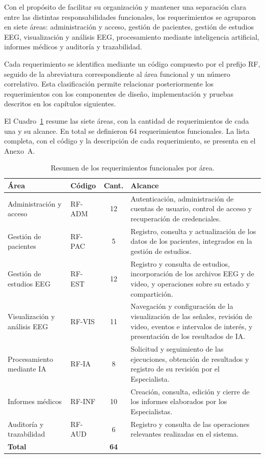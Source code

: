 Con el propósito de facilitar su organización y mantener una separación
clara entre las distintas responsabilidades funcionales, los requerimientos
se agruparon en siete áreas: administración y acceso, gestión de pacientes,
gestión de estudios EEG, visualización y análisis EEG, procesamiento mediante
inteligencia artificial, informes médicos y auditoría y trazabilidad.

Cada requerimiento se identifica mediante un código compuesto por el prefijo
RF, seguido de la abreviatura correspondiente al área funcional y un número
correlativo. Esta clasificación permite relacionar posteriormente los
requerimientos con los componentes de diseño, implementación y pruebas
descritos en los capítulos siguientes.

\begin{nuevotexto}
El Cuadro~\ref{tab:resumen-rf} resume las siete áreas, con la cantidad de requerimientos de cada una y su alcance.
En total se definieron 64 requerimientos funcionales.
La lista completa, con el código y la descripción de cada requerimiento, se presenta en el Anexo~A.

\begin{table}[H]
\centering
\marcanuevo
\caption{Resumen de los requerimientos funcionales por área.}
\label{tab:resumen-rf}
\small
\renewcommand{\arraystretch}{1.2}
\begin{tabular}{|p{3.6cm}|p{1.6cm}|c|p{7.2cm}|}
\hline
\textbf{Área} & \textbf{Código} & \textbf{Cant.} & \textbf{Alcance} \\
\hline
Administración y acceso & RF-ADM & 12 & Autenticación, administración de cuentas de usuario, control de acceso y recuperación de credenciales. \\
\hline
Gestión de pacientes & RF-PAC & 5 & Registro, consulta y actualización de los datos de los pacientes, integrados en la gestión de estudios. \\
\hline
Gestión de estudios EEG & RF-EST & 12 & Registro y consulta de estudios, incorporación de los archivos EEG y de video, y operaciones sobre su estado y compartición. \\
\hline
Visualización y análisis EEG & RF-VIS & 11 & Navegación y configuración de la visualización de las señales, revisión de video, eventos e intervalos de interés, y presentación de los resultados de IA. \\
\hline
Procesamiento mediante IA & RF-IA & 8 & Solicitud y seguimiento de las ejecuciones, obtención de resultados y registro de su revisión por el Especialista. \\
\hline
Informes médicos & RF-INF & 10 & Creación, consulta, edición y cierre de los informes elaborados por los Especialistas. \\
\hline
Auditoría y trazabilidad & RF-AUD & 6 & Registro y consulta de las operaciones relevantes realizadas en el sistema. \\
\hline
\textbf{Total} & & \textbf{64} & \\
\hline
\end{tabular}
\end{table}
\end{nuevotexto}

